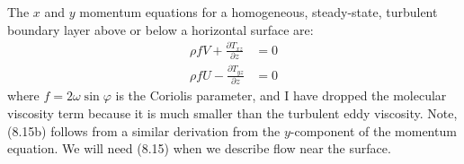 The $x$ and $y$ momentum equations for a homogeneous, steady-state,
turbulent boundary layer above or below a horizontal surface are:
\begin{subequations}
\begin{align}
\rho fV + \frac{\partial {T_{xz}}}{\partial z} & = 0 \\
\rho fU - \frac{\partial {T_{yz}}}{\partial z} & = 0
\end{align}
\end{subequations}
where $f=2\omega \sin \varphi$ is the Coriolis
parameter, and I have dropped the molecular
viscosity term because it is much smaller than the turbulent eddy
viscosity. Note, (8.15b) follows from a similar derivation from the
$y$-component of the momentum equation. We will need (8.15) when we
describe flow near the surface.

